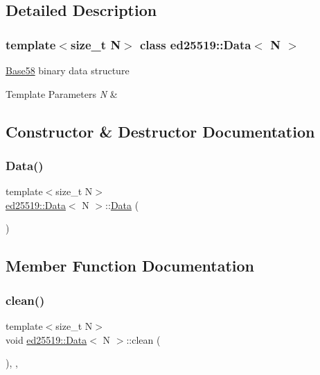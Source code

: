 \subsection{Detailed Description}
\subsubsection*{template$<$size\+\_\+t N$>$\newline
class ed25519\+::\+Data$<$ N $>$}

\mbox{\hyperlink{classed25519_1_1_base58}{Base58}} binary data structure 
\begin{DoxyTemplParams}{Template Parameters}
{\em N} & \\
\hline
\end{DoxyTemplParams}


\subsection{Constructor \& Destructor Documentation}
\mbox{\label{classed25519_1_1_data_a2c637587095d6527cd4136926fb8b452}} 
\subsubsection{\texorpdfstring{Data()}{Data()}}
{\footnotesize\ttfamily template$<$size\+\_\+t N$>$ \\
\mbox{\hyperlink{classed25519_1_1_data}{ed25519\+::\+Data}}$<$ N $>$\+::\mbox{\hyperlink{classed25519_1_1_data}{Data}} (\begin{DoxyParamCaption}{ }\end{DoxyParamCaption})\hspace{0.3cm}{\ttfamily [inline]}}



\subsection{Member Function Documentation}
\mbox{\label{classed25519_1_1_data_a22626c9e5a951dd673bfda8e78bf14fc}} 
\subsubsection{\texorpdfstring{clean()}{clean()}}
{\footnotesize\ttfamily template$<$size\+\_\+t N$>$ \\
void \mbox{\hyperlink{classed25519_1_1_data}{ed25519\+::\+Data}}$<$ N $>$\+::clean (\begin{DoxyParamCaption}{ }\end{DoxyParamCaption})\hspace{0.3cm}{\ttfamily [inline]}, {\ttfamily [override]}, {\ttfamily [virtual]}}


